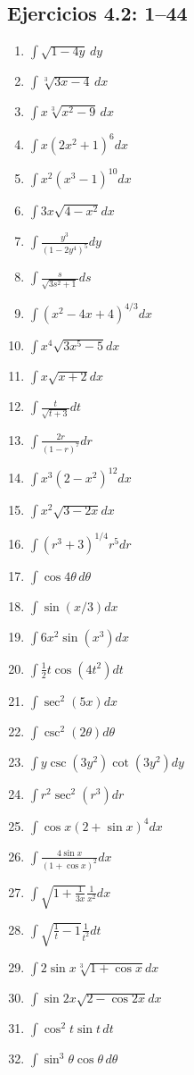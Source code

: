 \documentclass[11pt]{article}
\begin{document}
\subsection*{Ejercicios 4.2: 1--44}
\begin{enumerate}[itemsep=3pt]
\item $\int\sqrt{1-4y}\,dy$ \item $\int\sqrt[3]{3x-4}\,dx$ \item $\int x\sqrt[3]{x^2-9}\,dx$ \item $\int x(2x^2+1)^6dx$
\item $\int x^2(x^3-1)^{10}dx$ \item $\int3x\sqrt{4-x^2}dx$ \item $\int\frac{y^3}{(1-2y^4)^5}dy$ \item $\int\frac{s}{\sqrt{3s^2+1}}ds$
\item $\int(x^2-4x+4)^{4/3}dx$ \item $\int x^4\sqrt{3x^5-5}dx$ \item $\int x\sqrt{x+2}dx$ \item $\int\frac{t}{\sqrt{t+3}}dt$
\item $\int\frac{2r}{(1-r)^7}dr$ \item $\int x^3(2-x^2)^{12}dx$ \item $\int x^2\sqrt{3-2x}dx$ \item $\int(r^3+3)^{1/4}r^5dr$
\item $\int\cos4\theta\,d\theta$ \item $\int\sin(x/3)dx$ \item $\int6x^2\sin(x^3)dx$ \item $\int\frac12t\cos(4t^2)dt$
\item $\int\sec^2(5x)dx$ \item $\int\csc^2(2\theta)d\theta$ \item $\int y\csc(3y^2)\cot(3y^2)dy$ \item $\int r^2\sec^2(r^3)dr$
\item $\int\cos x(2+\sin x)^4dx$ \item $\int\frac{4\sin x}{(1+\cos x)^2}dx$ \item $\int\sqrt{1+\frac1{3x}}\frac1{x^2}dx$ \item $\int\sqrt{\frac1t-1}\frac1{t^2}dt$
\item $\int2\sin x\sqrt[3]{1+\cos x}dx$ \item $\int\sin2x\sqrt{2-\cos2x}dx$ \item $\int\cos^2t\sin t\,dt$ \item $\int\sin^3\theta\cos\theta\,d\theta$

\end{enumerate}
\end{document}
